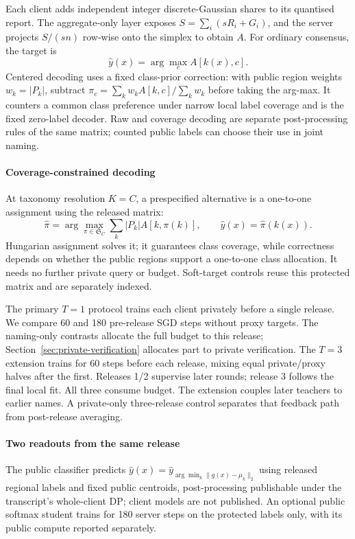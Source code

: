 Each client adds independent integer discrete-Gaussian shares to its quantised
report. The aggregate-only layer exposes $S=\sum_i(sR_i+G_i)$, and the server
projects $S/(sn)$ row-wise onto the simplex to obtain $A$.
For ordinary consensus, the target is
\begin{equation}
\hat y(x)=\arg\max_c A[k(x),c].\label{eq:targets}
\end{equation}
Centered decoding uses a fixed class-prior correction: with public region weights
$w_k=|P_k|$, subtract
$\pi_c=\sum_k w_k A[k,c]/\sum_k w_k$ before taking the arg-max.
It counters a common class preference under narrow local label coverage and
is the fixed zero-label decoder. Raw and coverage decoding are separate post-processing rules of the
same matrix; counted public labels can choose their use in joint naming.

\paragraph{Coverage-constrained decoding}
At taxonomy resolution $K=C$, a prespecified alternative is a one-to-one
assignment using the released matrix:
\begin{equation}
\hat\pi=\arg\max_{\pi\in\mathfrak S_C}\sum_k |P_k|A[k,\pi(k)],
\qquad \hat y(x)=\hat\pi(k(x)).
\label{eq:matching}
\end{equation}
Hungarian assignment solves it; it guarantees class coverage, while
correctness depends on whether the public regions support a one-to-one class
allocation. It needs no further private query or budget.
Soft-target controls reuse this protected matrix and are separately indexed.

The primary $T=1$ protocol trains each client privately before a single
release. We compare 60 and 180 pre-release SGD steps without proxy targets.
The naming-only contrasts allocate the full budget to this release;
Section~\ref{sec:private-verification} allocates part to private verification.
The $T=3$ extension trains for 60 steps before each release, mixing equal
private/proxy halves after the first. Releases 1/2 supervise later rounds;
release 3 follows the final local fit. All three consume budget. The extension couples later teachers to earlier names. A private-only
three-release control separates that feedback path from post-release averaging.

\paragraph{Two readouts from the same release}
The public classifier predicts
$\hat y(x)=\hat y_{\arg\min_k\|g(x)-\mu_k\|_2}$ using released regional
labels and fixed public centroids, post-processing publishable under the
transcript's whole-client DP; client models are not published. An optional
public softmax student trains for 180 server steps on the protected labels
only, with its public compute reported separately.

